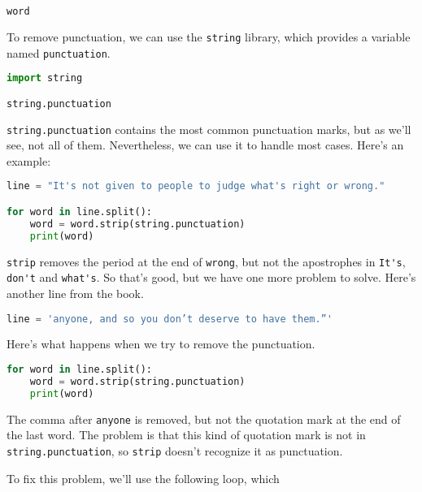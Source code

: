\begin{lstlisting}[language=Python,style=source]
word
\end{lstlisting}

To remove punctuation, we can use the \passthrough{\lstinline!string!}
library, which provides a variable named
\passthrough{\lstinline!punctuation!}.

\begin{lstlisting}[language=Python,style=source]
import string

string.punctuation
\end{lstlisting}

\passthrough{\lstinline!string.punctuation!} contains the most common
punctuation marks, but as we'll see, not all of them. Nevertheless, we
can use it to handle most cases. Here's an example:

\begin{lstlisting}[language=Python,style=source]
line = "It's not given to people to judge what's right or wrong."

for word in line.split():
    word = word.strip(string.punctuation)
    print(word)
\end{lstlisting}

\passthrough{\lstinline!strip!} removes the period at the end of
\passthrough{\lstinline!wrong!}, but not the apostrophes in
\passthrough{\lstinline!It's!}, \passthrough{\lstinline!don't!} and
\passthrough{\lstinline!what's!}. So that's good, but we have one more
problem to solve. Here's another line from the book.

\begin{lstlisting}[language=Python,style=source]
line = 'anyone, and so you don’t deserve to have them.”'
\end{lstlisting}

Here's what happens when we try to remove the punctuation.

\begin{lstlisting}[language=Python,style=source]
for word in line.split():
    word = word.strip(string.punctuation)
    print(word)
\end{lstlisting}

The comma after \passthrough{\lstinline!anyone!} is removed, but not the
quotation mark at the end of the last word. The problem is that this
kind of quotation mark is not in
\passthrough{\lstinline!string.punctuation!}, so
\passthrough{\lstinline!strip!} doesn't recognize it as punctuation.

To fix this problem, we'll use the following loop, which

